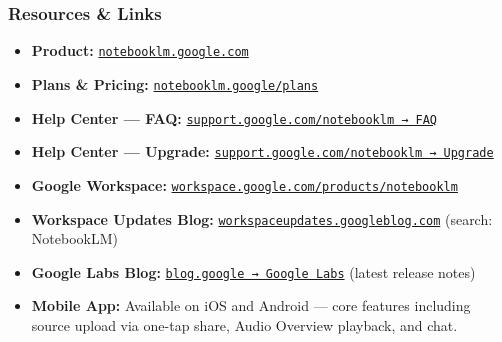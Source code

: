 \begin{frame}[fragile]\frametitle{Resources \& Links}
  \begin{itemize}
    \item \textbf{Product:} \href{https://notebooklm.google.com}{\texttt{notebooklm.google.com}}
    \item \textbf{Plans \& Pricing:} \href{https://notebooklm.google/plans}{\texttt{notebooklm.google/plans}}
    \item \textbf{Help Center — FAQ:} \href{https://support.google.com/notebooklm/answer/16269187}{\texttt{support.google.com/notebooklm → FAQ}}
    \item \textbf{Help Center — Upgrade:} \href{https://support.google.com/notebooklm/answer/16213268}{\texttt{support.google.com/notebooklm → Upgrade}}
    \item \textbf{Google Workspace:} \href{https://workspace.google.com/products/notebooklm/}{\texttt{workspace.google.com/products/notebooklm}}
    \item \textbf{Workspace Updates Blog:} \href{https://workspaceupdates.googleblog.com}{\texttt{workspaceupdates.googleblog.com}} (search: NotebookLM)
    \item \textbf{Google Labs Blog:} \href{https://blog.google/innovation-and-ai/models-and-research/google-labs/}{\texttt{blog.google → Google Labs}} (latest release notes)
    \item \textbf{Mobile App:} Available on iOS and Android — core features including source upload via one-tap share, Audio Overview playback, and chat.
  \end{itemize}
\end{frame}
